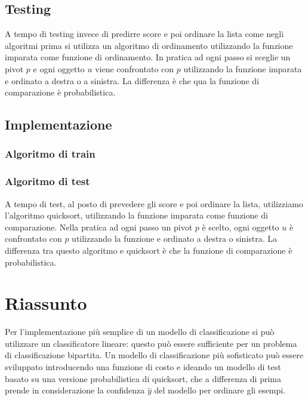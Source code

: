 	\subsection{Testing}
	A tempo di testing invece di predirre score e poi ordinare la lista come negli algoritmi prima si utilizza un algoritmo di ordinamento utilizzando la funzione imparata come funzione di ordinamento.
	In pratica ad ogni passo si sceglie un pivot $p$ e ogni oggetto $u$ viene confrontato con $p$ utilizzando la funzione imparata e ordinato a destra o a sinistra.
	La differenza \`e che qua la funzione di comparazione \`e probabilistica.
	
	\subsection{Implementazione}
	
		\subsubsection{Algoritmo di train}
		
		
		\subsubsection{Algoritmo di test}
		A tempo di test, al posto di prevedere gli score e poi ordinare la lista, utilizziamo l'algoritmo quicksort, utilizzando la funzione imparata come funzione di comparazione. 
		Nella pratica ad ogni passo un pivot $p$ \`e scelto, ogni oggetto $u$ \`e confrontato con $p$ utilizzando la funzione e ordinato a destra o sinistra. 
		La differenza tra questo algoritmo e quicksort \`e che la funzione di comparazione \`e probabilistica.
		
\section{Riassunto}

Per l'implementazione più semplice di un modello di classificazione si può utilizzare un classificatore lineare: questo può essere sufficiente per un problema di classificazione bipartita.
Un modello di classificazione più sofisticato può essere sviluppato introducendo una funzione di costo e ideando un modello di test basato su una versione probabilistica di quicksort, che a differenza di prima prende in considerazione la confidenza $\hat{y}$ del modello per ordinare gli esempi.
